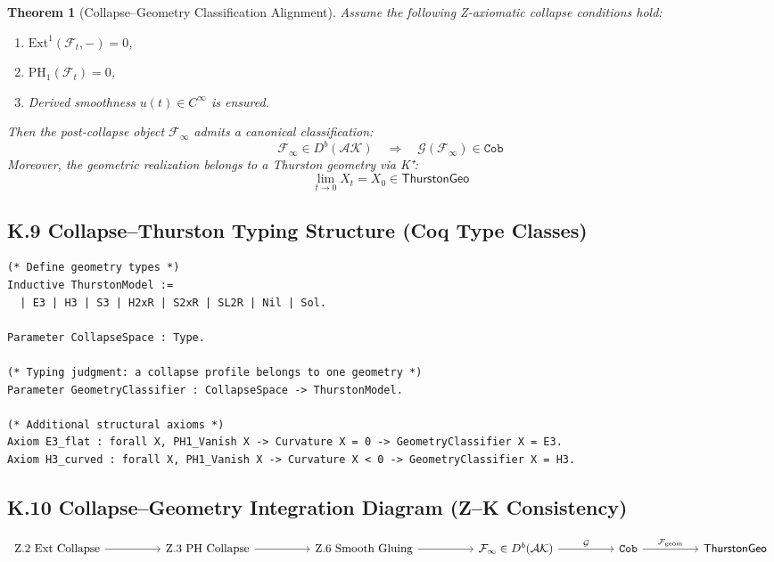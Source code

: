 \documentclass[11pt]{article}
\newtheorem{theorem}{Theorem}[section]
\begin{document}
\begin{axiom}
\begin{axiom}
\begin{theorem}[Collapse–Geometry Classification Alignment]
Assume the following Z-axiomatic collapse conditions hold:
\begin{enumerate}
  \item[(Z.2)] \( \mathrm{Ext}^1(\mathcal{F}_t, -) = 0 \),
  \item[(Z.3)] \( \mathrm{PH}_1(\mathcal{F}_t) = 0 \),
  \item[(Z.6)] Derived smoothness \( u(t) \in C^\infty \) is ensured.
\end{enumerate}
Then the post-collapse object \( \mathcal{F}_\infty \) admits a canonical classification:
\[
\mathcal{F}_\infty \in D^b(\mathcal{AK}) \quad \Rightarrow \quad \mathcal{G}(\mathcal{F}_\infty) \in \texttt{Cob}
\]
Moreover, the geometric realization belongs to a Thurston geometry via K⁺:
\[
\lim_{t \to 0} X_t = X_0 \in \mathsf{ThurstonGeo}
\]
\end{theorem}

\subsection*{K.9 Collapse–Thurston Typing Structure (Coq Type Classes)}

\begin{lstlisting}[language=Coq]
(* Define geometry types *)
Inductive ThurstonModel :=
  | E3 | H3 | S3 | H2xR | S2xR | SL2R | Nil | Sol.

Parameter CollapseSpace : Type.

(* Typing judgment: a collapse profile belongs to one geometry *)
Parameter GeometryClassifier : CollapseSpace -> ThurstonModel.

(* Additional structural axioms *)
Axiom E3_flat : forall X, PH1_Vanish X -> Curvature X = 0 -> GeometryClassifier X = E3.
Axiom H3_curved : forall X, PH1_Vanish X -> Curvature X < 0 -> GeometryClassifier X = H3.
\end{lstlisting}

\subsection*{K.10 Collapse–Geometry Integration Diagram (Z–K Consistency)}

\[
\begin{tikzcd}[row sep=large, column sep=huge]
\text{Z.2 Ext Collapse} \arrow[r] &
\text{Z.3 PH Collapse} \arrow[r] &
\text{Z.6 Smooth Gluing} \arrow[r] &
\mathcal{F}_\infty \in D^b(\mathcal{AK}) \arrow[r, "\mathcal{G}"] &
\texttt{Cob} \arrow[r, "\mathcal{F}_{\mathrm{geom}}"] &
\mathsf{ThurstonGeo}
\end{tikzcd}
\]


\end{axiom}
\end{axiom}
\end{document}
